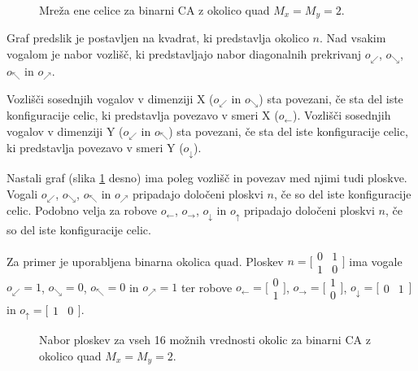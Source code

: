 \documentclass[12pt,a4paper,openany,twoside]{book}
\begin{document}
\begin{figure}[htb]
\centerline{}
\caption[Mreža ene celice.]{Mreža ene celice za binarni CA z okolico quad \(M_x=M_y=2\).}
\label{network_single}
\end{figure}

Graf predslik je postavljen na kvadrat, ki predstavlja okolico \(n\).
Nad vsakim vogalom je nabor vozlišč, ki predstavljajo nabor diagonalnih prekrivanj
\(o_{\swarrow}\), \(o_{\searrow}\), \(o_{\nwarrow}\) in \(o_{\nearrow}\).

Vozlišči sosednjih vogalov v dimenziji X (\(o_{\swarrow}\) in \(o_{\searrow}\)) sta povezani,
če sta del iste konfiguracije celic, ki predstavlja povezavo v smeri X (\(o_{\leftarrow}\)).
Vozlišči sosednjih vogalov v dimenziji Y (\(o_{\swarrow}\) in \(o_{\nwarrow}\)) sta povezani,
če sta del iste konfiguracije celic, ki predstavlja povezavo v smeri Y (\(o_{\downarrow}\)).

Nastali graf (slika \ref{network_single} desno) ima poleg vozlišč in povezav med njimi tudi ploskve.
Vogali \(o_{\swarrow}\), \(o_{\searrow}\), \(o_{\nwarrow}\) in \(o_{\nearrow}\)
pripadajo določeni ploskvi \(n\), če so del iste konfiguracije celic.
Podobno velja za robove \(o_{\leftarrow}\), \(o_{\rightarrow}\), \(o_{\downarrow}\) in \(o_{\uparrow}\)
pripadajo določeni ploskvi \(n\), če so del iste konfiguracije celic.

Za primer je uporabljena binarna okolica quad.
Ploskev \(n=\bigl[\begin{smallmatrix} 0&1 \\ 1&0 \end{smallmatrix}\bigr]\)
ima vogale \(o_{\swarrow}=1\), \(o_{\searrow}=0\), \(o_{\nwarrow}=0\) in \(o_{\nearrow}=1\) ter robove
\(o_{\leftarrow}=\bigl[\begin{smallmatrix} 0 \\ 1 \end{smallmatrix}\bigr]\),
\(o_{\rightarrow}=\bigl[\begin{smallmatrix} 1 \\ 0 \end{smallmatrix}\bigr]\),
\(o_{\downarrow}=\bigl[\begin{smallmatrix} 0 & 1 \end{smallmatrix}\bigr]\) in
\(o_{\uparrow}=\bigl[\begin{smallmatrix} 1 & 0 \end{smallmatrix}\bigr]\).

\begin{figure}[htb]
\centerline{}
\caption[Nabor ploskev.]{Nabor ploskev za vseh 16 možnih vrednosti okolic za binarni CA z okolico quad \(M_x=M_y=2\).}
\label{neighborhood_surfaces}
\end{figure}
\end{document}
